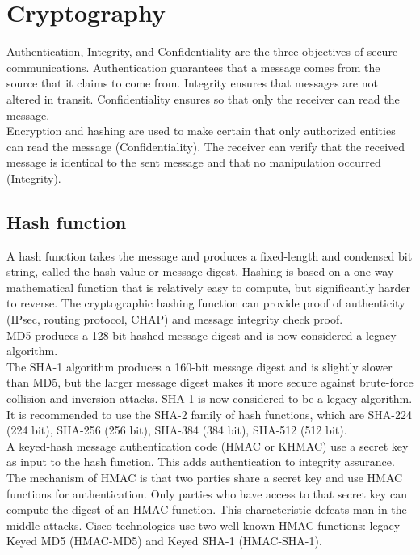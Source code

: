 \chapter{Cryptography}

Authentication, Integrity, and Confidentiality are the three objectives of secure communications. Authentication guarantees that a message comes from the source that it claims to come from. Integrity ensures that messages are not altered in transit. Confidentiality ensures so that only the receiver can read the message.\\

Encryption and hashing are used to make certain that only authorized entities can read the message (Confidentiality). The receiver can verify that the received message is identical to the sent message and that no manipulation occurred (Integrity). \\



\section{Hash function}

A hash function takes the message and produces a fixed-length and condensed bit string, called the hash value or message digest. Hashing is based on a one-way mathematical function that is relatively easy to compute, but significantly harder to reverse. The cryptographic hashing function can provide proof of authenticity (IPsec, routing protocol, CHAP) and message integrity check proof.\\

MD5 produces a 128-bit hashed message digest and is now considered a legacy algorithm.\\

The SHA-1 algorithm produces a 160-bit message digest and is slightly slower than MD5, but the larger message digest makes it more secure against brute-force collision and inversion attacks. SHA-1 is now considered to be a legacy algorithm. It is recommended to use the SHA-2 family of hash functions, which are SHA-224 (224 bit), SHA-256 (256 bit), SHA-384 (384 bit), SHA-512 (512 bit). \\

A keyed-hash message authentication code (HMAC or KHMAC) use a secret key as input to the hash function. This adds authentication to integrity assurance. The mechanism of HMAC is that two parties share a secret key and use HMAC functions for authentication. Only parties who have access to that secret key can compute the digest of an HMAC function. This characteristic defeats man-in-the-middle attacks. Cisco technologies use two well-known HMAC functions: legacy Keyed MD5 (HMAC-MD5) and Keyed SHA-1 (HMAC-SHA-1).\\

